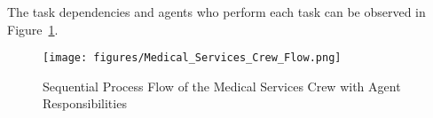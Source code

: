 The task dependencies and agents who perform each task can be observed in Figure~\ref{fig:medical_services_flow}.

\begin{figure}[h!]
	\centering
	\texttt{[image: figures/Medical\_Services\_Crew\_Flow.png]}
	\caption{Sequential Process Flow of the Medical Services Crew with Agent Responsibilities}
	\label{fig:medical_services_flow}
\end{figure}
